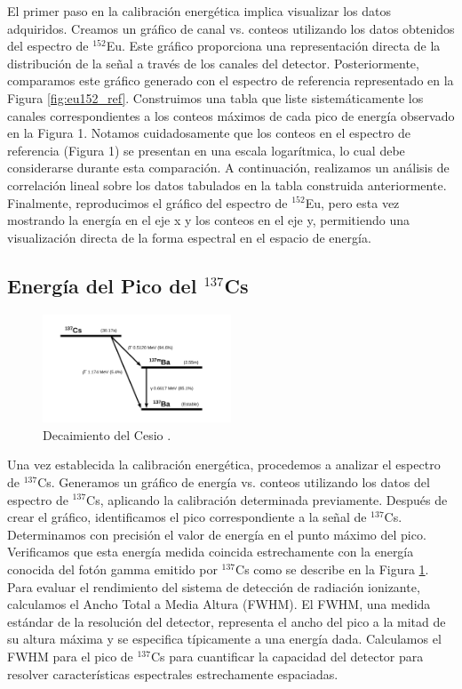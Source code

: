 \documentclass[twocolumn,a4paper,11pt]{scrartcl}
\begin{document}
El primer paso en la calibración energética implica visualizar los datos adquiridos. Creamos un gráfico de canal vs. conteos utilizando los datos obtenidos del espectro de $^{152}$Eu. Este gráfico proporciona una representación directa de la distribución de la señal a través de los canales del detector.  Posteriormente, comparamos este gráfico generado con el espectro de referencia representado en la Figura \ref{fig:eu152_ref}. Construimos una tabla que liste sistemáticamente los canales correspondientes a los conteos máximos de cada pico de energía observado en la Figura 1. Notamos cuidadosamente que los conteos en el espectro de referencia (Figura 1) se presentan en una escala logarítmica, lo cual debe considerarse durante esta comparación.  A continuación, realizamos un análisis de correlación lineal sobre los datos tabulados en la tabla construida anteriormente. Finalmente, reproducimos el gráfico del espectro de $^{152}$Eu, pero esta vez mostrando la energía en el eje x y los conteos en el eje y, permitiendo una visualización directa de la forma espectral en el espacio de energía.

\subsection*{Energía del Pico del $^{137}$Cs}


\begin{figure}[]
  \includegraphics[width=0.50\textwidth]{decaimiento_cesio.png}
  \caption{Decaimiento del Cesio \cite{FirestoneShirley1996} \cite{Garrett1980}.}
  \label{fig:decaimiento_cs}
\end{figure}

Una vez establecida la calibración energética, procedemos a analizar el espectro de $^{137}$Cs. Generamos un gráfico de energía vs. conteos utilizando los datos del espectro de $^{137}$Cs, aplicando la calibración determinada previamente. Después de crear el gráfico, identificamos el pico correspondiente a la señal de $^{137}$Cs. Determinamos con precisión el valor de energía en el punto máximo del pico. Verificamos que esta energía medida coincida estrechamente con la energía conocida del fotón gamma emitido por $^{137}$Cs como se describe en la Figura \ref{fig:decaimiento_cs}. Para evaluar el rendimiento del sistema de detección de radiación ionizante, calculamos el Ancho Total a Media Altura (FWHM). El FWHM, una medida estándar de la resolución del detector, representa el ancho del pico a la mitad de su altura máxima y se especifica típicamente a una energía dada. Calculamos el FWHM para el pico de $^{137}$Cs para cuantificar la capacidad del detector para resolver características espectrales estrechamente espaciadas.
\end{document}
